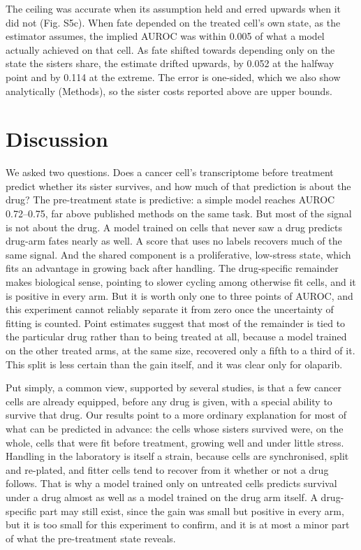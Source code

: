 \documentclass[11pt,a4paper]{article}
\begin{document}
The ceiling was accurate when its assumption held and erred upwards when it did not (Fig. S5c). When fate depended on the treated cell's own state, as the estimator assumes, the implied AUROC was within 0.005 of what a model actually achieved on that cell. As fate shifted towards depending only on the state the sisters share, the estimate drifted upwards, by 0.052 at the halfway point and by 0.114 at the extreme. The error is one-sided, which we also show analytically (Methods), so the sister costs reported above are upper bounds.

\section*{Discussion}

We asked two questions. Does a cancer cell's transcriptome before treatment predict whether its sister survives, and how much of that prediction is about the drug? The pre-treatment state is predictive: a simple model reaches AUROC 0.72--0.75, far above published methods on the same task. But most of the signal is not about the drug. A model trained on cells that never saw a drug predicts drug-arm fates nearly as well. A score that uses no labels recovers much of the same signal. And the shared component is a proliferative, low-stress state, which fits an advantage in growing back after handling. The drug-specific remainder makes biological sense, pointing to slower cycling among otherwise fit cells, and it is positive in every arm. But it is worth only one to three points of AUROC, and this experiment cannot reliably separate it from zero once the uncertainty of fitting is counted. Point estimates suggest that most of the remainder is tied to the particular drug rather than to being treated at all, because a model trained on the other treated arms, at the same size, recovered only a fifth to a third of it. This split is less certain than the gain itself, and it was clear only for olaparib.

Put simply, a common view, supported by several studies, is that a few cancer cells are already equipped, before any drug is given, with a special ability to survive that drug. Our results point to a more ordinary explanation for most of what can be predicted in advance: the cells whose sisters survived were, on the whole, cells that were fit before treatment, growing well and under little stress. Handling in the laboratory is itself a strain, because cells are synchronised, split and re-plated, and fitter cells tend to recover from it whether or not a drug follows. That is why a model trained only on untreated cells predicts survival under a drug almost as well as a model trained on the drug arm itself. A drug-specific part may still exist, since the gain was small but positive in every arm, but it is too small for this experiment to confirm, and it is at most a minor part of what the pre-treatment state reveals.
\end{document}
